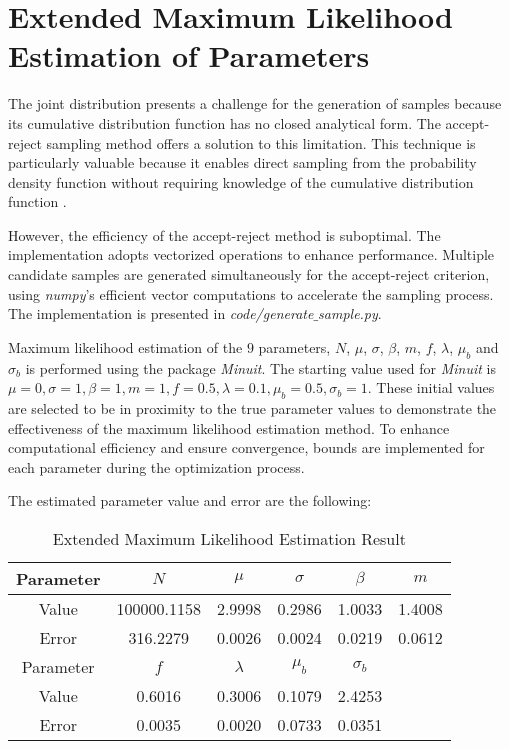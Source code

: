 \documentclass[a4paper, 12pt]{article}
\begin{document}
\section{Extended Maximum Likelihood Estimation of Parameters}
\hspace{1.5em}The joint distribution presents a challenge for the generation of samples because its cumulative distribution function has no closed analytical form. The accept-reject sampling method offers a solution to this limitation. This technique is particularly valuable because it enables direct sampling from the probability density function without requiring knowledge of the cumulative distribution function \cite{lecturenotes2024}. 
\par However, the efficiency of the accept-reject method is suboptimal. The implementation adopts vectorized operations to enhance performance. Multiple candidate samples are generated simultaneously for the accept-reject criterion, using \textit{numpy}'s efficient vector computations to accelerate the sampling process. The implementation is presented in \textit{code/generate$\_$sample.py}.
\par Maximum likelihood estimation of the $9$ parameters,  $N$, $\mu$, $\sigma$, $\beta$, $m$, $f$, $\lambda$, $\mu_{b}$ and $\sigma_{b}$ is performed using the package \textit{Minuit}. The starting value used for \textit{Minuit} is $\mu = 0,\sigma = 1, \beta = 1,m = 1,f = 0.5,\lambda = 0.1,\mu_b = 0.5,\sigma_b = 1$. These initial values are selected to be in proximity to the true parameter values to demonstrate the effectiveness of the maximum likelihood estimation method. To enhance computational efficiency and ensure convergence, bounds are implemented for each parameter during the optimization process. 
\par The estimated parameter value and error are the following:
\begin{table}[H]
\centering
\begin{tabular}{|c|ccccc|} \hline
Parameter & $N$           & $\mu$   & $\sigma$ & $\beta$    & $m$    \\ \hline
Value     & 100000.1158 & 2.9998  & 0.2986   & 1.0033     & 1.4008 \\
Error     & 316.2279    & 0.0026  & 0.0024   & 0.0219     & 0.0612 \\ \hline
Parameter & $f$           & $\lambda$ & $\mu_{b}$  & $\sigma_{b}$ &        \\
Value     & 0.6016      & 0.3006  & 0.1079   & 2.4253     &        \\
Error     & 0.0035      & 0.0020  & 0.0733   & 0.0351     &        \\ \hline
\end{tabular}
\caption{Extended Maximum Likelihood Estimation Result}
\end{table}
\end{document}
